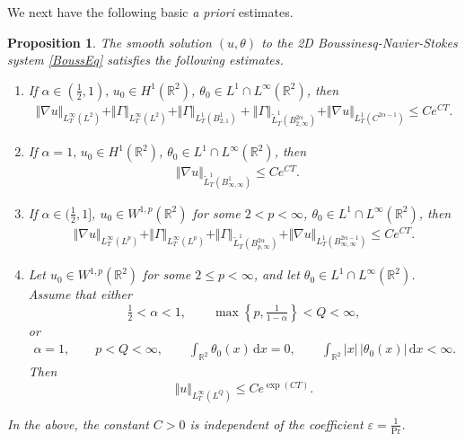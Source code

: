 \documentclass[reqno,11pt,a4paper]{amsart}
\newtheorem{proposition}[theorem]{Proposition}
\newcommand{\dd}{\mathrm{d}}
\begin{document}
We next have the following basic \textit{{\it{a priori}}} estimates.
\begin{proposition}\label{prop:ap-es-basic}
  The smooth solution $(u,\theta)$ to the 2D Boussinesq-Navier-Stokes system \eqref{BoussEq} satisfies the following estimates.
\begin{enumerate}[(1)]
\item
If $\alpha\in(\frac{1}{2},1),\,u_0\in H^1(\mathbb{R}^2)$, $\theta_0\in L^1\cap L^\infty(\mathbb{R}^2)$, then 
\begin{align}\label{eq:u-Gam-es2}
  \Vert \nabla u\Vert _{L^\infty_T(L^2)} +  \Vert \Gamma\Vert _{L^\infty_T(L^2)}+ \Vert \Gamma\Vert _{L^1_T(B^1_{2,1})}
  + \left\Vert \Gamma\right\Vert _{\widetilde{L}_T^1 (B_{2, \infty}^{2\alpha})}
  + \Vert \nabla u\Vert _{L^1_T(C^{2\alpha-1})} 
  \leq C e^{C T} .
\end{align}
\item 
If $\alpha=1,\,u_0\in H^1(\mathbb{R}^2)$, $\theta_0\in L^1\cap L^\infty(\mathbb{R}^2)$, then 
\begin{align}\label{es:nabu-Gam2-2b}
  \Vert \nabla u\Vert _{\widetilde{L}^1_T( B^1_{\infty,\infty})} \leq C e^{CT}. \quad   
\end{align}
\item
 If $\alpha\in(\frac{1}{2},1]$, $u_0\in W^{1,p}(\mathbb{R}^2)$ for some $2<p<\infty$,  
$\theta_0\in L^1\cap L^\infty(\mathbb{R}^2)$, 
then
\begin{align}\label{es:nabu-Gam2}
  \Vert \nabla u\Vert _{L^\infty_T(L^p)}+\Vert \Gamma\Vert _{L^\infty_T(L^p)}
  + \Vert \Gamma\Vert _{\widetilde{L}^1_T(B^{2\alpha}_{p,\infty})}
  +  \Vert \nabla u\Vert _{L^1_T(B^{2\alpha-1}_{\infty,\infty})}
  \leq C e^{CT} .
\end{align}
\item
Let $u_0\in W^{1,p}(\mathbb R^2)$ for some
$2\leq p<\infty$, and let
$\theta_0\in L^1\cap L^\infty(\mathbb R^2)$.
Assume that either
\[
  \tfrac12<\alpha<1,
  \qquad
  \max\left\{p,\tfrac1{1-\alpha}\right\}<Q<\infty,
\]
or
\[
  \begin{gathered}
    \alpha=1,\qquad p<Q<\infty,\qquad
    \int_{\mathbb R^2}\theta_0(x)\,\dd x=0,
    \qquad
    \int_{\mathbb R^2}|x|\,|\theta_0(x)|\,\dd x<\infty.
  \end{gathered}
\]
Then
\begin{equation}\label{eq:u-LQ-es}
  \Vert u\Vert _{L^\infty_T(L^Q)}
  \leq Ce^{\exp(CT)}.
\end{equation}
\end{enumerate}
In the above, the constant $C>0$ is independent of the coefficient $\varepsilon=\frac{1}{\mathrm{Pr}}$.
\end{proposition}
\end{document}
